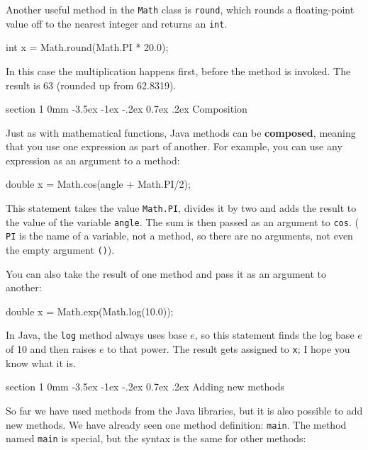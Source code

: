 \documentclass{book}
\makeatletter
\renewcommand{\section}{\@startsection 
    {section} {1} {0mm}%
    {-3.5ex \@plus -1ex \@minus -.2ex}%
    {0.7ex \@plus.2ex}%
    {\normalfont\Large\bfseries}}
\makeatother
\begin{document}
Another useful method in the {\tt Math} class is {\tt round},
which rounds a floating-point value off to the nearest integer
and returns an {\tt int}.

\begin{verbatimtab}
    int x = Math.round(Math.PI * 20.0);
\end{verbatimtab}
%
In this case the multiplication happens first, before the
method is invoked.  The result is 63 (rounded up from 62.8319).


\section {Composition}
\label{composition}

Just as with mathematical functions, Java methods can be {\bf
composed}, meaning that you use one expression as part of another.
For example, you can use any expression as an argument to a method:

\begin{verbatimtab}
    double x = Math.cos(angle + Math.PI/2);
\end{verbatimtab}
%
This statement takes the value {\tt Math.PI}, divides it by two and
adds the result to the value of the variable {\tt angle}.  The sum is
then passed as an argument to {\tt cos}. ({\tt
PI} is the name of a variable, not a method, so there are no
arguments, not even the empty argument {\tt()}).

You can also take the result of one method and pass it as
an argument to another:

\begin{verbatimtab}
    double x = Math.exp(Math.log(10.0));
\end{verbatimtab}
%
In Java, the {\tt log} method always uses base $e$, so this
statement finds the log base $e$ of 10 and then raises $e$ to that
power.  The result gets assigned to {\tt x}; I hope you know what it
is.

\section{Adding new methods}
\label{adding_methods}

So far we have used methods from the Java libraries,
but it is also possible to add new methods.  We have already
seen one method definition: {\tt main}.  The method named {\tt main}
is special, but the syntax is the same for other methods:
\end{document}
